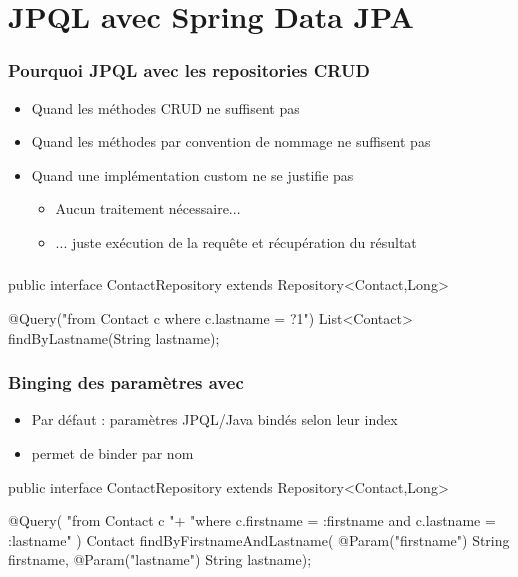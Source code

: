 \section{JPQL avec Spring Data JPA}



\begin{frame}
 \frametitle{Pourquoi JPQL avec les repositories CRUD}
 \begin{itemize}
  \item Quand les méthodes CRUD ne suffisent pas
  \item Quand les méthodes par convention de nommage ne suffisent pas
  \item Quand une implémentation custom ne se justifie pas
  \begin{itemize}
    \item Aucun traitement nécessaire...
    \item ... juste exécution de la requête et récupération du résultat
  \end{itemize}
 \end{itemize}
\end{frame}

\begin{frame}[fragile]
 \frametitle{}
 \begin{javacode}
public interface ContactRepository extends Repository<Contact,Long> {

  @Query("from Contact c where c.lastname = ?1")
  List<Contact> findByLastname(String lastname);
	
}
 \end{javacode}
\end{frame}

\begin{frame}[fragile]
 \frametitle{Binging des paramètres avec }
 \begin{itemize}
  \item Par défaut : paramètres JPQL/Java bindés selon leur index
  \item {} permet de binder par nom
 \end{itemize}

 \begin{javacode}
public interface ContactRepository extends Repository<Contact,Long> {

  @Query(
    "from Contact c "+
    "where c.firstname = :firstname and c.lastname = :lastname"
  )
  Contact findByFirstnameAndLastname(
     @Param("firstname") String firstname, 
     @Param("lastname") String lastname);

}
 \end{javacode}
\end{frame}

